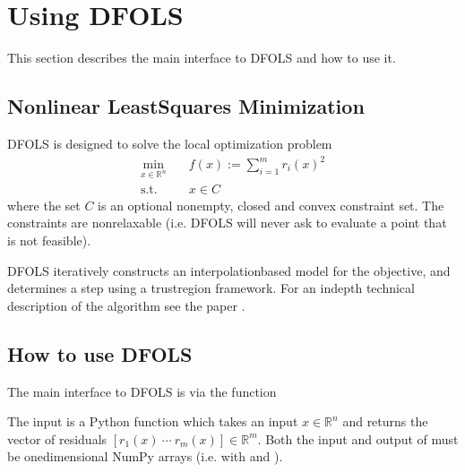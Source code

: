\documentclass[letterpaper,10pt,english]{sphinxmanual}
\begin{document}
\chapter{Using DFO\sphinxhyphen{}LS}
\label{\detokenize{userguide:using-dfo-ls}}\label{\detokenize{userguide::doc}}
This section describes the main interface to DFO\sphinxhyphen{}LS and how to use it.


\section{Nonlinear Least\sphinxhyphen{}Squares Minimization}
\label{\detokenize{userguide:nonlinear-least-squares-minimization}}
DFO\sphinxhyphen{}LS is designed to solve the local optimization problem
\begin{equation*}
\begin{split}\min_{x\in\mathbb{R}^n}  &\quad  f(x) := \sum_{i=1}^{m}r_{i}(x)^2 \\
\text{s.t.} &\quad x \in C\end{split}
\end{equation*}
where the set \(C\) is an optional non\sphinxhyphen{}empty, closed and convex constraint set. The constraints are non\sphinxhyphen{}relaxable (i.e. DFO\sphinxhyphen{}LS will never ask to evaluate a point that is not feasible).

DFO\sphinxhyphen{}LS iteratively constructs an interpolation\sphinxhyphen{}based model for the objective, and determines a step using a trust\sphinxhyphen{}region framework.
For an in\sphinxhyphen{}depth technical description of the algorithm see the paper .


\section{How to use DFO\sphinxhyphen{}LS}
\label{\detokenize{userguide:how-to-use-dfo-ls}}
The main interface to DFO\sphinxhyphen{}LS is via the function 
\begin{quote}

\begin{sphinxVerbatim}[commandchars=\\\{\}]
   
\end{sphinxVerbatim}
\end{quote}

The input  is a Python function which takes an input \(x\in\mathbb{R}^n\) and returns the vector of residuals \([r_1(x)\: \cdots \: r_m(x)]\in\mathbb{R}^m\). Both the input and output of  must be one\sphinxhyphen{}dimensional NumPy arrays (i.e. with  and ).
\end{document}
